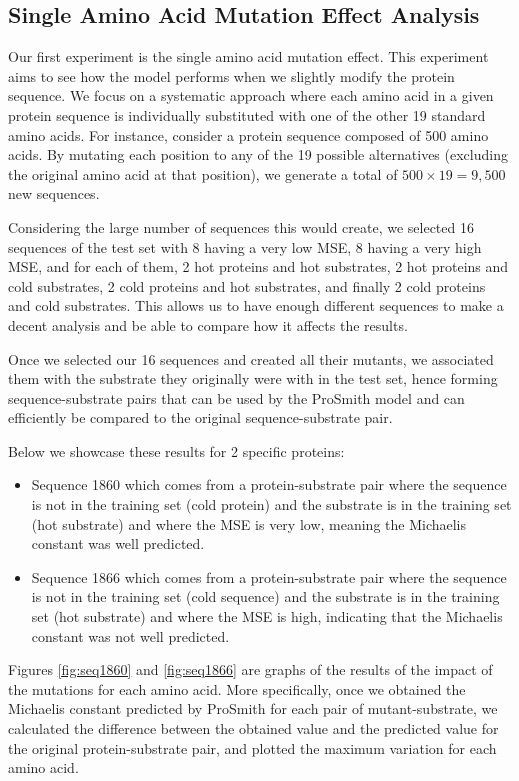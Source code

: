 \subsection{Single Amino Acid Mutation Effect Analysis}

Our first experiment is the single amino acid mutation effect. This experiment aims to see how the model
performs when we slightly modify the protein sequence. We focus on a systematic approach where each amino acid in a given protein sequence is individually substituted with one of the other 19 standard amino acids. For instance, consider a protein sequence composed of 500 amino acids. By mutating each position to any of the 19 possible alternatives (excluding the original amino acid at that position), we generate a total of  $500\times19=9,500$ new sequences.

Considering the large number of sequences this would create, we selected 16 sequences of the test set with
8 having a very low MSE, 8 having a very high MSE, and for each of them, 2 hot proteins and hot substrates, 
2 hot proteins and cold substrates, 2 cold proteins and hot substrates, and finally 2 cold proteins and
cold substrates. This allows us to have enough different sequences to make a decent analysis and be
able to compare how it affects the results. 

Once we selected our 16 sequences and created all their mutants, we associated them with the substrate they
originally were with in the test set, hence forming sequence-substrate pairs that can be used by the ProSmith
model and can efficiently be compared to the original sequence-substrate pair.

Below we showcase these results for 2 specific proteins: 
\begin{itemize}
    \item Sequence 1860 which comes from a protein-substrate
    pair where the sequence is not in the training set (cold protein) and the substrate is in the training set 
    (hot substrate) and where the MSE is very low, meaning the Michaelis constant was well predicted.
    \item Sequence 1866 which comes from a protein-substrate pair where the sequence is not in the training set
    (cold sequence) and the substrate is in the training set (hot substrate) and where the MSE is high,
    indicating that the Michaelis constant was not well predicted.
\end{itemize}

Figures \ref{fig:seq1860} and \ref{fig:seq1866} are graphs of the results of the impact of the mutations for each amino acid. More specifically, once we obtained the Michaelis constant predicted by ProSmith for each pair of mutant-substrate, we calculated the difference between the obtained value and the predicted value for the original protein-substrate pair, and plotted the maximum variation for each amino acid.


